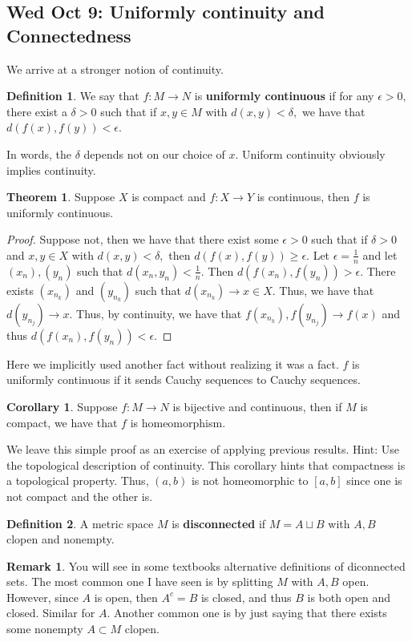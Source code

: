 \documentclass[10pt, oneside]{article}
\theoremstyle{definition}
\newtheorem{thm}{Theorem}
\newtheorem{defn}{Definition}
\newtheorem{rem}{Remark}
\newtheorem{cor}{Corollary}
\begin{document}
\subsection{Wed Oct 9: Uniformly continuity and Connectedness}
We arrive at a stronger notion of continuity.
\begin{defn}
    We say that $f: M \to N$ is \textbf{uniformly continuous} if for any $\epsilon>0,$ there exist a $\delta>0$ such that if $x,y \in M$ with $d(x,y)< \delta,$ we have that $d(f(x), f(y))< \epsilon.$
\end{defn}
In words, the $\delta$ depends not on our choice of $x.$ Uniform continuity obviously implies continuity.
\begin{thm}
    Suppose $X$ is compact and $f: X \to Y$ is continuous, then $f$ is uniformly continuous.
\end{thm}
\begin{proof}
    Suppose not, then we have that there exist some $\epsilon>0$ such that if $\delta>0$ and $x,y \in X$ with $d(x,y)< \delta,$ then $d(f(x), f(y))\geq \epsilon.$ Let $\epsilon = \frac{1}{n}$ and let $(x_n), (y_n)$ such that $d(x_n, y_n)< \frac{1}{n}.$ Then $d(f(x_n), f(y_n))> \epsilon.$ There exists $(x_{n_k})$ and $(y_{n_k})$ such that $d(x_{n_k}) \to x \in X.$ Thus, we have that $d(y_{n_j})\to x.$ Thus, by continuity, we have that $f(x_{n_k}), f(y_{n_j})\to f(x)$ and thus $d(f(x_n), f(y_n))< \epsilon.$
\end{proof}
Here we implicitly used another fact without realizing it was a fact. $f$ is uniformly continuous if it sends Cauchy sequences to Cauchy sequences.
\begin{cor}
    Suppose $f: M \to N$ is bijective and continuous, then if $M$ is compact, we have that $f$ is homeomorphism. 
\end{cor}
We leave this simple proof as an exercise of applying previous results. Hint: Use the topological description of continuity. This corollary hints that compactness is a topological property. Thus, $(a,b)$ is not homeomorphic to $[a,b]$ since one is not compact and the other is.
\begin{defn}
    A metric space $M$ is \textbf{disconnected} if $M = A \sqcup B$ with $A,B$ clopen and nonempty.
\end{defn}
\begin{rem}
    You will see in some textbooks alternative definitions of diconnected sets. The most common one I have seen is by splitting $M$ with $A,B$ open. However, since $A$ is open, then $A^c = B$ is closed, and thus $B$ is both open and closed. Similar for $A.$ Another common one is by just saying that there exists some nonempty $A \subset M$ clopen. 
\end{rem}
\end{document}

